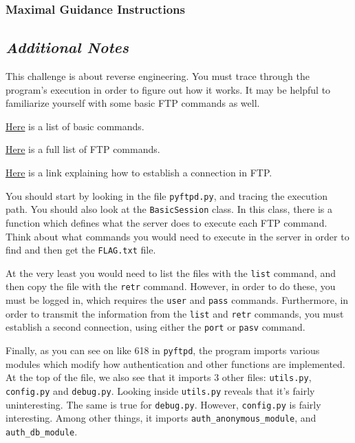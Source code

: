         \subsubsection{Maximal Guidance Instructions}
            {\parindent0pt\singlespacing
                \subsection*{\textit{Additional Notes}}
                    This challenge is about reverse engineering. You must trace through the program's execution in order to figure out how it works. It may be helpful to familiarize yourself with some basic FTP commands as well. 

                    \href{https://kb.iu.edu/d/aenq}{Here} is a list of basic commands.

                    \href{https://en.wikipedia.org/wiki/List_of_FTP_commands}{Here} is a full list of FTP commands.

                    \href{https://www.serv-u.com/resource/tutorial/pasv-response-epsv-port-pbsz-rein-ftp-command#fac52a38-7ddb-4815-a9dc-72cc03c0a8e6}{Here} is a link explaining how to establish a connection in FTP.

                    You should start by looking in the file \lstinline`pyftpd.py`, and tracing the execution path. You should also look at the \lstinline`BasicSession` class. In this class, there is a function which defines what the server does to execute each FTP command. Think about what commands you would need to execute in the server in order to find and then get the \lstinline`FLAG.txt` file. 

                    At the very least you would need to list the files with the \lstinline`list` command, and then copy the file with the \lstinline`retr` command. However, in order to do these, you must be logged in, which requires the \lstinline`user` and \lstinline`pass` commands. Furthermore, in order to transmit the information from the \lstinline`list` and \lstinline`retr` commands, you must establish a second connection, using either the \lstinline`port` or \lstinline`pasv` command. 

                    Finally, as you can see on like 618 in \lstinline`pyftpd`, the program imports various modules which modify how authentication and other functions are implemented. At the top of the file, we also see that it imports 3 other files: \lstinline`utils.py`, \lstinline`config.py` and \lstinline`debug.py`. Looking inside \lstinline`utils.py` reveals that it's fairly uninteresting. The same is true for \lstinline`debug.py`. However, \lstinline`config.py` is fairly interesting. Among other things, it imports \lstinline`auth_anonymous_module`, and \lstinline`auth_db_module`. 

}
